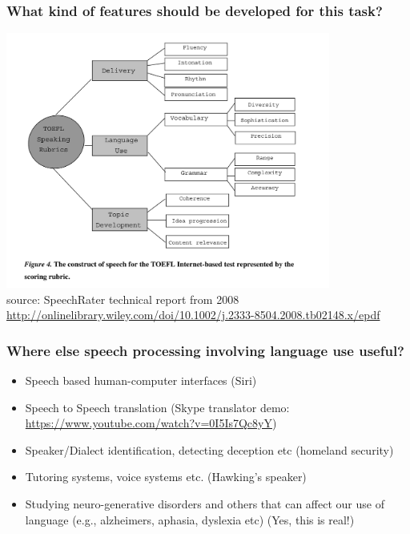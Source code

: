 \documentclass{beamer}
\begin{document}
\begin{frame}
\frametitle{What kind of features should be developed for this task?}
\includegraphics[width=0.8\textwidth]{rubric.png}
 \\ \footnotesize source: SpeechRater technical report from 2008 
 \\ \url{http://onlinelibrary.wiley.com/doi/10.1002/j.2333-8504.2008.tb02148.x/epdf}
\end{frame}

\begin{frame}
\frametitle{Where else speech processing involving language use useful?}
\begin{itemize}
\item Speech based human-computer interfaces (Siri)
\item Speech to Speech translation (Skype translator demo: \url{https://www.youtube.com/watch?v=0I5Is7Qc8yY})
\item Speaker/Dialect identification, detecting deception etc (homeland security)
\item Tutoring systems, voice systems etc. (Hawking's speaker)
\item Studying neuro-generative disorders and others that can affect our use of language (e.g., alzheimers, aphasia, dyslexia etc) (Yes, this is real!)
\end{itemize}
\end{frame}
\end{document}
